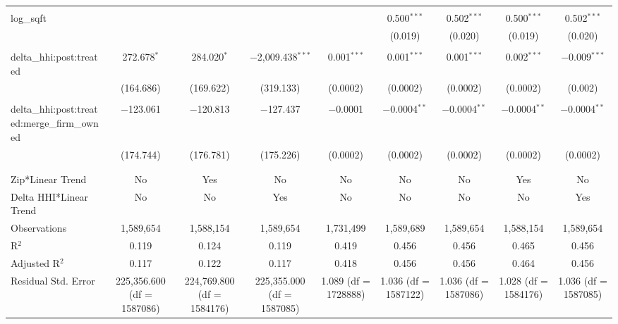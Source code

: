 \begin{table}[H]
{\begin{tabular}{@{\extracolsep{5pt}}lcccccccc}
   & & & & & & & & \\  

  log\_sqft &  &  &  &  & 0.500$^{***}$ & 0.502$^{***}$ & 0.500$^{***}$ & 0.502$^{***}$ \\  

   &  &  &  &  & (0.019) & (0.020) & (0.019) & (0.020) \\  

   & & & & & & & & \\  

  delta\_hhi:post:treated & 272.678$^{*}$ & 284.020$^{*}$ & $-$2,009.438$^{***}$ & 0.001$^{***}$ & 0.001$^{***}$ & 0.001$^{***}$ & 0.002$^{***}$ & $-$0.009$^{***}$ \\  

   & (164.686) & (169.622) & (319.133) & (0.0002) & (0.0002) & (0.0002) & (0.0002) & (0.002) \\  

   & & & & & & & & \\  

  delta\_hhi:post:treated:merge\_firm\_owned & $-$123.061 & $-$120.813 & $-$127.437 & $-$0.0001 & $-$0.0004$^{**}$ & $-$0.0004$^{**}$ & $-$0.0004$^{**}$ & $-$0.0004$^{**}$ \\  

   & (174.744) & (176.781) & (175.226) & (0.0002) & (0.0002) & (0.0002) & (0.0002) & (0.0002) \\  

   & & & & & & & & \\  

 \hline \\[-1.8ex]  

 Zip*Linear Trend & No & Yes & No & No & No & No & Yes & No \\  

 Delta HHI*Linear Trend & No & No & Yes & No & No & No & No & Yes \\  

 Observations & 1,589,654 & 1,588,154 & 1,589,654 & 1,731,499 & 1,589,689 & 1,589,654 & 1,588,154 & 1,589,654 \\  

 R$^{2}$ & 0.119 & 0.124 & 0.119 & 0.419 & 0.456 & 0.456 & 0.465 & 0.456 \\  

 Adjusted R$^{2}$ & 0.117 & 0.122 & 0.117 & 0.418 & 0.456 & 0.456 & 0.464 & 0.456 \\  

 Residual Std. Error & 225,356.600 (df = 1587086) & 224,769.800 (df = 1584176) & 225,355.000 (df = 1587085) & 1.089 (df = 1728888) & 1.036 (df = 1587122) & 1.036 (df = 1587086) & 1.028 (df = 1584176) & 1.036 (df = 1587085) \\  


\end{tabular}}
\end{table}
